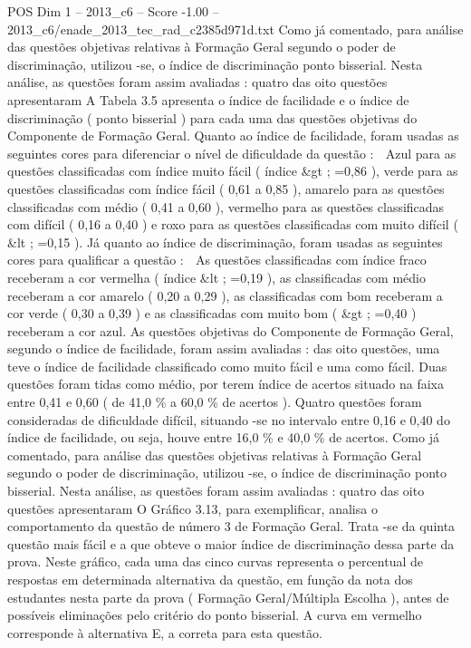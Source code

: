 \begin{textsample}{POS Dim 1 – 2013\_c6 – Score -1.00 – 2013\_c6/enade\_2013\_tec\_rad\_c2385d971d.txt}
Como já comentado, para análise das questões objetivas relativas à Formação Geral segundo o poder de discriminação, utilizou -se, o índice de discriminação ponto bisserial.
Nesta análise, as questões foram assim avaliadas : quatro das oito questões apresentaram A Tabela 3.5 apresenta o índice de facilidade e o índice de discriminação ( ponto bisserial ) para cada uma das questões objetivas do Componente de Formação Geral.
Quanto ao índice de facilidade, foram usadas as seguintes cores para diferenciar o nível de dificuldade da questão :  Azul para as questões classificadas com índice muito fácil ( índice \&gt ; =0,86 ), verde para as questões classificadas com índice fácil ( 0,61 a 0,85 ), amarelo para as questões classificadas com médio ( 0,41 a 0,60 ), vermelho para as questões classificadas com difícil ( 0,16 a 0,40 ) e roxo para as questões classificadas com muito difícil ( \&lt ; =0,15 ).
Já quanto ao índice de discriminação, foram usadas as seguintes cores para qualificar a questão :  As questões classificadas com índice fraco receberam a cor vermelha ( índice \&lt ; =0,19 ), as classificadas com médio receberam a cor amarelo ( 0,20 a 0,29 ), as classificadas com bom receberam a cor verde ( 0,30 a 0,39 ) e as classificadas com muito bom ( \&gt ; =0,40 ) receberam a cor azul.
As questões objetivas do Componente de Formação Geral, segundo o índice de facilidade, foram assim avaliadas : das oito questões, uma teve o índice de facilidade classificado como muito fácil e uma como fácil.
Duas questões foram tidas como médio, por terem índice de acertos situado na faixa entre 0,41 e 0,60 ( de 41,0 \% a 60,0 \% de acertos ).
Quatro questões foram consideradas de dificuldade difícil, situando -se no intervalo entre 0,16 e 0,40 do índice de facilidade, ou seja, houve entre 16,0 \% e 40,0 \% de acertos.
Como já comentado, para análise das questões objetivas relativas à Formação Geral segundo o poder de discriminação, utilizou -se, o índice de discriminação ponto bisserial.
Nesta análise, as questões foram assim avaliadas : quatro das oito questões apresentaram O Gráfico 3.13, para exemplificar, analisa o comportamento da questão de número 3 de Formação Geral.
Trata -se da quinta questão mais fácil e a que obteve o maior índice de discriminação dessa parte da prova.
Neste gráfico, cada uma das cinco curvas representa o percentual de respostas em determinada alternativa da questão, em função da nota dos estudantes nesta parte da prova ( Formação Geral/Múltipla Escolha ), antes de possíveis eliminações pelo critério do ponto bisserial.
A curva em vermelho corresponde à alternativa E, a correta para esta questão.

\end{textsample}
